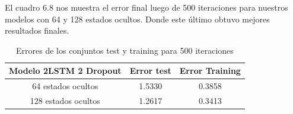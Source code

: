 El cuadro 6.8 nos muestra el error final luego de 500 iteraciones para nuestros modelos con 64 y 128 estados ocultos. Donde este último obtuvo mejores resultados finales.
\begin{table}[H]
	\centering
	\begin{tabular}{|c|c|c|}
		\hline
		\rowcolor{Gray}  Modelo 2LSTM 2 Dropout & Error test& Error Training \\ \hline
		64 estados ocultos &        1.5330 &             0.3858     \\ \hline
		128 estados ocultos	&		1.2617 	&				0.3413   \\ \hline
	\end{tabular}
	\caption{Errores de los conjuntos test y training para 500 iteraciones}
\end{table}